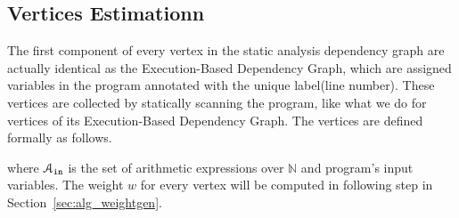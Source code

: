 \subsection{Vertices Estimationn}
\label{sec:alg_vertexgen}
The first component of every vertex in the static analysis dependency graph are actually identical as the  Execution-Based Dependency Graph, which are assigned variables in the program annotated with the unique label(line number). 
These vertices are collected by statically scanning the program, like what we do for vertices of its Execution-Based Dependency Graph. 
The vertices are defined formally as follows.

where $\mathcal{A}_{\mathtt{in}}$ is the set of arithmetic expressions over $\mathbb{N}$ and program's input variables. 
The weight $w$ for every vertex will be computed in following step in Section~\ref{sec:alg_weightgen}.

%


